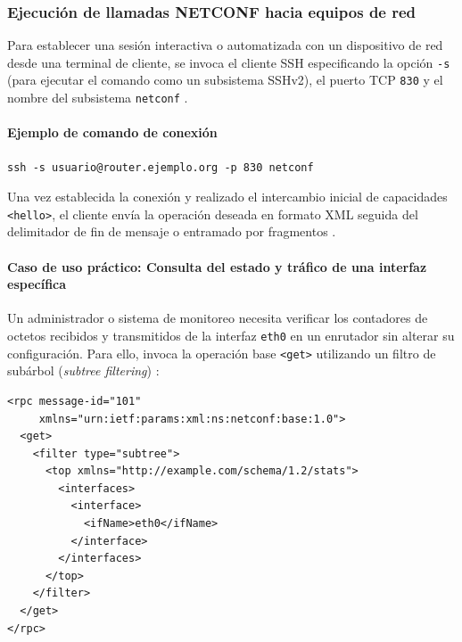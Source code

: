 \documentclass[12pt,a4paper]{article}
\begin{document}
\subsubsection{Ejecución de llamadas NETCONF hacia equipos de red}

Para establecer una sesión interactiva o automatizada con un dispositivo de red desde una terminal de cliente, se invoca el cliente SSH especificando la opción \texttt{-s} (para ejecutar el comando como un subsistema SSHv2), el puerto TCP \texttt{830} y el nombre del subsistema \texttt{netconf} \parencite{wasserman2011rfc6242}.

\paragraph{Ejemplo de comando de conexión}

\begin{lstlisting}[caption={Comando de conexión a un dispositivo mediante el subsistema NETCONF sobre SSH (adaptado de Wasserman, 2011)}]
ssh -s usuario@router.ejemplo.org -p 830 netconf
\end{lstlisting}

Una vez establecida la conexión y realizado el intercambio inicial de capacidades \texttt{<hello>}, el cliente envía la operación deseada en formato XML seguida del delimitador de fin de mensaje o entramado por fragmentos \parencite{wasserman2011rfc6242}.

\paragraph{Caso de uso práctico: Consulta del estado y tráfico de una interfaz específica}

Un administrador o sistema de monitoreo necesita verificar los contadores de octetos recibidos y transmitidos de la interfaz \texttt{eth0} en un enrutador sin alterar su configuración. Para ello, invoca la operación base \texttt{<get>} utilizando un filtro de subárbol (\textit{subtree filtering}) \parencite{enns2011rfc6241}:

\begin{lstlisting}[caption={Solicitud RPC \texttt{<get>} con filtro de subárbol para consultar el estado de una interfaz (adaptado de Enns et al., 2011)}]
<rpc message-id="101"
     xmlns="urn:ietf:params:xml:ns:netconf:base:1.0">
  <get>
    <filter type="subtree">
      <top xmlns="http://example.com/schema/1.2/stats">
        <interfaces>
          <interface>
            <ifName>eth0</ifName>
          </interface>
        </interfaces>
      </top>
    </filter>
  </get>
</rpc>
\end{lstlisting}
\end{document}
